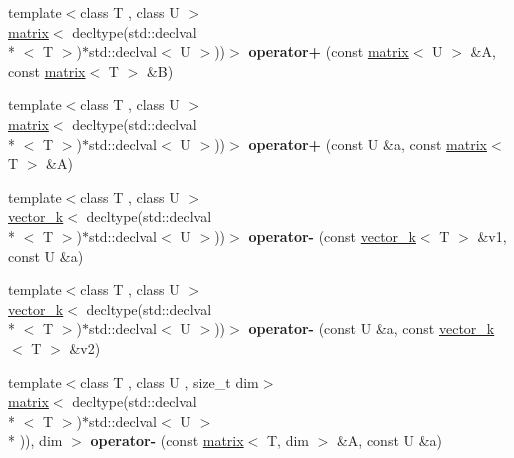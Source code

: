\begin{DoxyCompactItemize}
\item 
\hypertarget{namespacekeycpp_a30432b8cff4c33e034a2ae34ea477a0a}{{\footnotesize template$<$class T , class U $>$ }\\\hyperlink{classkeycpp_1_1matrix}{matrix}$<$ decltype(std\-::declval\\*
$<$ T $>$)$\ast$std\-::declval$<$ U $>$))$>$ {\bfseries operator+} (const \hyperlink{classkeycpp_1_1matrix}{matrix}$<$ U $>$ \&A, const \hyperlink{classkeycpp_1_1matrix}{matrix}$<$ T $>$ \&B)}\label{namespacekeycpp_a30432b8cff4c33e034a2ae34ea477a0a}

\item 
\hypertarget{namespacekeycpp_a4b4a64905c9d681c174b2dfcfba272c4}{{\footnotesize template$<$class T , class U $>$ }\\\hyperlink{classkeycpp_1_1matrix}{matrix}$<$ decltype(std\-::declval\\*
$<$ T $>$)$\ast$std\-::declval$<$ U $>$))$>$ {\bfseries operator+} (const U \&a, const \hyperlink{classkeycpp_1_1matrix}{matrix}$<$ T $>$ \&A)}\label{namespacekeycpp_a4b4a64905c9d681c174b2dfcfba272c4}

\item 
\hypertarget{namespacekeycpp_a520b72efca1fbe800845b21a84d2d472}{{\footnotesize template$<$class T , class U $>$ }\\\hyperlink{classkeycpp_1_1vector__k}{vector\-\_\-k}$<$ decltype(std\-::declval\\*
$<$ T $>$)$\ast$std\-::declval$<$ U $>$))$>$ {\bfseries operator-\/} (const \hyperlink{classkeycpp_1_1vector__k}{vector\-\_\-k}$<$ T $>$ \&v1, const U \&a)}\label{namespacekeycpp_a520b72efca1fbe800845b21a84d2d472}

\item 
\hypertarget{namespacekeycpp_a1222c1fe6037feb8eacf0d2bd5152751}{{\footnotesize template$<$class T , class U $>$ }\\\hyperlink{classkeycpp_1_1vector__k}{vector\-\_\-k}$<$ decltype(std\-::declval\\*
$<$ T $>$)$\ast$std\-::declval$<$ U $>$))$>$ {\bfseries operator-\/} (const U \&a, const \hyperlink{classkeycpp_1_1vector__k}{vector\-\_\-k}$<$ T $>$ \&v2)}\label{namespacekeycpp_a1222c1fe6037feb8eacf0d2bd5152751}

\item 
\hypertarget{namespacekeycpp_af05e48a344f24985b26ddcd3584c6b3f}{{\footnotesize template$<$class T , class U , size\-\_\-t dim$>$ }\\\hyperlink{classkeycpp_1_1matrix}{matrix}$<$ decltype(std\-::declval\\*
$<$ T $>$)$\ast$std\-::declval$<$ U $>$\\*
)), dim $>$ {\bfseries operator-\/} (const \hyperlink{classkeycpp_1_1matrix}{matrix}$<$ T, dim $>$ \&A, const U \&a)}\label{namespacekeycpp_af05e48a344f24985b26ddcd3584c6b3f}


\end{DoxyCompactItemize}
